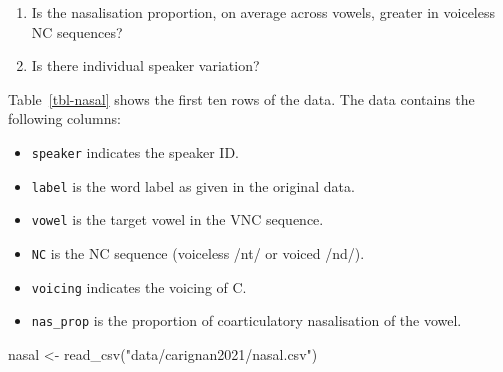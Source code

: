 \documentclass[
  authoryear,
  preprint,
  3p]{elsarticle}
\newenvironment{Shaded}{\begin{snugshade}}{\end{snugshade}}
\newcommand{\FunctionTok}[1]{\textcolor[rgb]{0.28,0.35,0.67}{#1}}
\newcommand{\NormalTok}[1]{\textcolor[rgb]{0.00,0.23,0.31}{#1}}
\newcommand{\OtherTok}[1]{\textcolor[rgb]{0.00,0.23,0.31}{#1}}
\newcommand{\StringTok}[1]{\textcolor[rgb]{0.13,0.47,0.30}{#1}}
\providecommand{\tightlist}{%
  \setlength{\itemsep}{0pt}\setlength{\parskip}{0pt}} %
\begin{document}
\begin{enumerate}
\def\labelenumi{\arabic{enumi}.}
\tightlist
\item
  Is the nasalisation proportion, on average across vowels, greater in
  voiceless NC sequences?
\item
  Is there individual speaker variation?
\end{enumerate}

Table~\ref{tbl-nasal} shows the first ten rows of the data. The data
contains the following columns:

\begin{itemize}
\item
  \texttt{speaker} indicates the speaker ID.
\item
  \texttt{label} is the word label as given in the original data.
\item
  \texttt{vowel} is the target vowel in the VNC sequence.
\item
  \texttt{NC} is the NC sequence (voiceless /nt/ or voiced /nd/).
\item
  \texttt{voicing} indicates the voicing of C.
\item
  \texttt{nas\_prop} is the proportion of coarticulatory nasalisation of
  the vowel.
\end{itemize}

\begin{Shaded}
\begin{Highlighting}[]
\NormalTok{nasal }\OtherTok{\textless{}{-}} \FunctionTok{read\_csv}\NormalTok{(}\StringTok{"data/carignan2021/nasal.csv"}\NormalTok{)}
\end{Highlighting}
\end{Shaded}
\end{document}
